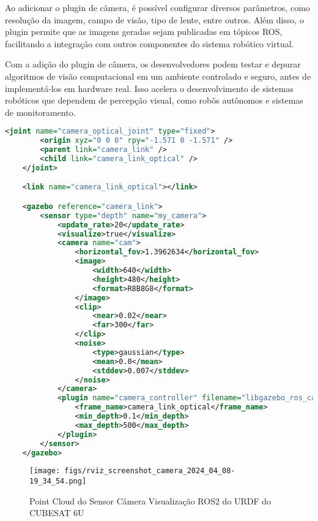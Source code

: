 Ao adicionar o plugin de câmera, é possível configurar diversos parâmetros, como resolução da imagem, campo de visão, tipo de lente, entre outros. Além disso, o plugin permite que as imagens geradas sejam publicadas em tópicos ROS, facilitando a integração com outros componentes do sistema robótico virtual.

Com a adição do plugin de câmera, os desenvolvedores podem testar e depurar algoritmos de visão computacional em um ambiente controlado e seguro, antes de implementá-los em hardware real. Isso acelera o desenvolvimento de sistemas robóticos que dependem de percepção visual, como robôs autônomos e sistemas de monitoramento.

            
\begin{lstlisting}[language=XML,caption={XML version}]
    <joint name="camera_optical_joint" type="fixed">
        <origin xyz="0 0 0" rpy="-1.571 0 -1.571" />
        <parent link="camera_link" />
        <child link="camera_link_optical" />
    </joint>

    <link name="camera_link_optical"></link>

    <gazebo reference="camera_link">
        <sensor type="depth" name="my_camera">
            <update_rate>20</update_rate>
            <visualize>true</visualize>
            <camera name="cam">
                <horizontal_fov>1.3962634</horizontal_fov>
                <image>
                    <width>640</width>
                    <height>480</height>
                    <format>R8B8G8</format>
                </image>
                <clip>
                    <near>0.02</near>
                    <far>300</far>
                </clip>
                <noise>
                    <type>gaussian</type>
                    <mean>0.0</mean>
                    <stddev>0.007</stddev>
                </noise>
            </camera>
            <plugin name="camera_controller" filename="libgazebo_ros_camera.so">
                <frame_name>camera_link_optical</frame_name>
                <min_depth>0.1</min_depth>
                <max_depth>500</max_depth>
            </plugin>
        </sensor>
    </gazebo>
\end{lstlisting}


\begin{figure}[htpb]
\centering
\texttt{[image: figs/rviz\_screenshot\_camera\_2024\_04\_08-19\_34\_54.png]}
\caption{Point Cloud do Sensor Câmera Visualização ROS2 do URDF do CUBESAT 6U}
\label{fig:12}
\end{figure}

